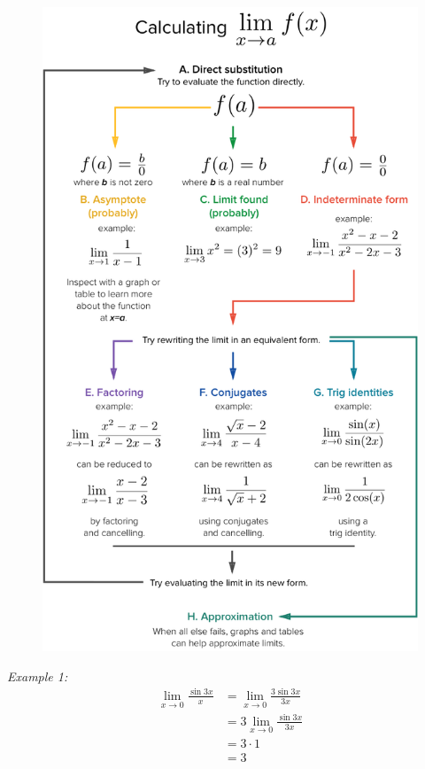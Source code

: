         \begin{figure} [hbt!]
            \centering
            \includegraphics[scale=0.5]{Resources/Unit1Limits/limitstrat.png}
        \end{figure}

        \noindent \color{blue} \textit{Example 1:} \color{black} \\

        \begin{align*}
            \lim_{x\to 0}\frac{\sin{3x}}{x} &= \lim_{x\to0}\frac{3\sin{3x}}{3x} \\
            &= 3\lim_{x\to0}\frac{\sin{3x}}{3x} \\
            &= 3\cdot1\\
            &= 3
        \end{align*}

